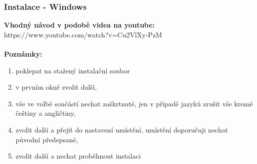 \documentclass{beamer}
\begin{document}
	\begin{frame}
    \frametitle{Instalace - Windows}
    	\textbf{Vhodný návod v podobě videa na youtube:} https://www.youtube.com/watch?v=Cu2VlXy-PzM \\~\\
    	
    	\textbf{Poznámky:}
		\begin{enumerate}
			\item poklepat na stažený instalační soubor
			\item v prvním okně zvolit další,
			\item vše ve volbě součástí nechat zaškrtnuté, jen v případě jazyků zrušit vše kromě češtiny a angličtiny,
			\item zvolit další a přejít do nastavení umístění, umístění doporučuji nechat původní předepsané,
			\item zvolit další a nechat proběhnout instalaci
		\end{enumerate}
	\end{frame}
\end{document}
